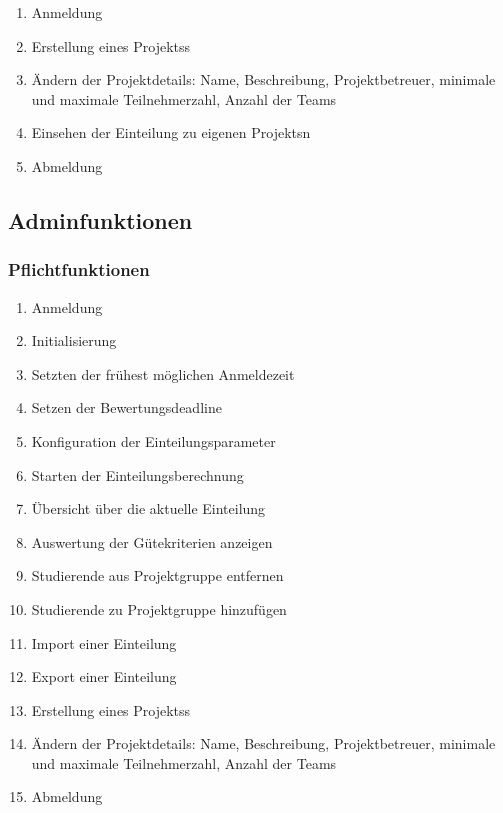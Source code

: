 \documentclass[parskip=full]{scrartcl}
\newcommand{\swtLabel}[1]{\textbf{/#1\arabic*0/}}
\begin{document}
\begin{enumerate}[label=\swtLabel{FA}, resume]
  \item Anmeldung
  \item Erstellung eines \glspl{Projekt}s
  \item Ändern der Projektdetails: Name, Beschreibung, Projektbetreuer,
        minimale und maximale Teilnehmerzahl, Anzahl der Teams %
  \item Einsehen der Einteilung zu eigenen \glspl{Projekt}n
  \item Abmeldung
\end{enumerate}

\subsection{Adminfunktionen}

\subsubsection{Pflichtfunktionen}

\begin{enumerate}[label=\swtLabel{FA}, resume]
  \item Anmeldung
  \item Initialisierung \label{FAinit}
  \item Setzten der frühest möglichen Anmeldezeit
  \item Setzen der Bewertungsdeadline
  \item Konfiguration der Einteilungsparameter
  \item Starten der Einteilungsberechnung
  \item Übersicht über die aktuelle Einteilung
  \item Auswertung der Gütekriterien anzeigen
  \item Studierende aus Projektgruppe entfernen
  \item Studierende zu Projektgruppe hinzufügen
  \item Import einer Einteilung \label{FAimport}
  \item Export einer Einteilung \label{FAexport}
  \item Erstellung eines \glspl{Projekt}s
  \item Ändern der Projektdetails: Name, Beschreibung, Projektbetreuer, %
        minimale und maximale Teilnehmerzahl, Anzahl der Teams
  \item Abmeldung
\end{enumerate}
\end{document}
